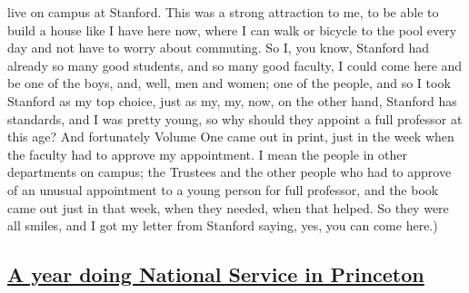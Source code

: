 \documentclass[]{article}
\begin{document}
live on campus at Stanford. This was a strong attraction to me, to be
able to build a house like I have here now, where I can walk or bicycle
to the pool every day and not have to worry about commuting. So I, you
know, Stanford had already so many good students, and so many good
faculty, I could come here and be one of the boys, and, well, men and
women; one of the people, and so I took Stanford as my top choice, just
as my, my, now, on the other hand, Stanford has standards, and I was
pretty young, so why should they appoint a full professor at this age?
And fortunately Volume One came out in print, just in the week when the
faculty had to approve my appointment. I mean the people in other
departments on campus; the Trustees and the other people who had to
approve of an unusual appointment to a young person for full professor,
and the book came out just in that week, when they needed, when that
helped. So they were all smiles, and I got my letter from Stanford
saying, yes, you can come here.)

\subsection{\texorpdfstring{\href{http://webofstories.com/play/17104}{A
year doing National Service in
Princeton}}{A year doing National Service in Princeton}}\label{a-year-doing-national-service-in-princeton}
\end{document}
